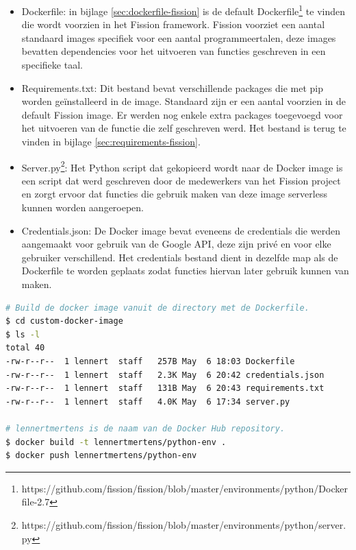 \begin{itemize}
    \item Dockerfile: in bijlage \ref{sec:dockerfile-fission} is de default Dockerfile\footnote{https://github.com/fission/fission/blob/master/environments/python/Dockerfile-2.7} te vinden die wordt voorzien in het Fission framework. Fission voorziet een aantal standaard images specifiek voor een aantal programmeertalen, deze images bevatten dependencies voor het uitvoeren van functies geschreven in een specifieke taal.
    \item Requirements.txt: Dit bestand bevat verschillende packages die met pip worden geïnstalleerd in de image. Standaard zijn er een aantal voorzien in de default Fission image. Er werden nog enkele extra packages toegevoegd voor het uitvoeren van de functie die zelf geschreven werd. Het bestand is terug te vinden in bijlage \ref{sec:requirements-fission}.
    \item Server.py\footnote{https://github.com/fission/fission/blob/master/environments/python/server.py}: Het Python script dat gekopieerd wordt naar de Docker image is een script dat werd geschreven door de medewerkers van het Fission project en zorgt ervoor dat functies die gebruik maken van deze image serverless kunnen worden aangeroepen. 
    \item Credentials.json: De Docker image bevat eveneens de credentials die werden aangemaakt voor gebruik van de Google API, deze zijn privé en voor elke gebruiker verschillend. Het credentials bestand dient in dezelfde map als de Dockerfile te worden geplaats zodat functies hiervan later gebruik kunnen van maken. 
\end{itemize}

\begin{lstlisting}[language=bash]
# Build de docker image vanuit de directory met de Dockerfile.
$ cd custom-docker-image
$ ls -l
total 40
-rw-r--r--  1 lennert  staff   257B May  6 18:03 Dockerfile
-rw-r--r--  1 lennert  staff   2.3K May  6 20:42 credentials.json
-rw-r--r--  1 lennert  staff   131B May  6 20:43 requirements.txt
-rw-r--r--  1 lennert  staff   4.0K May  6 17:34 server.py

# lennertmertens is de naam van de Docker Hub repository.
$ docker build -t lennertmertens/python-env . 
$ docker push lennertmertens/python-env
\end{lstlisting}

